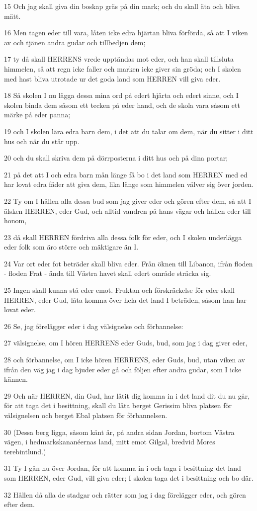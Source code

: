 \par 15 Och jag skall giva din boskap gräs på din mark; och du skall äta och bliva mätt.
\par 16 Men tagen eder till vara, låten icke edra hjärtan bliva förförda, så att I viken av och tjänen andra gudar och tillbedjen dem;
\par 17 ty då skall HERRENS vrede upptändas mot eder, och han skall tillsluta himmelen, så att regn icke faller och marken icke giver sin gröda; och I skolen med hast bliva utrotade ur det goda land som HERREN vill giva eder.
\par 18 Så skolen I nu lägga dessa mina ord på edert hjärta och edert sinne, och I skolen binda dem såsom ett tecken på eder hand, och de skola vara såsom ett märke på eder panna;
\par 19 och I skolen lära edra barn dem, i det att du talar om dem, när du sitter i ditt hus och när du står upp.
\par 20 och du skall skriva dem på dörrposterna i ditt hus och på dina portar;
\par 21 på det att I och edra barn mån länge få bo i det land som HERREN med ed har lovat edra fäder att giva dem, lika länge som himmelen välver sig över jorden.
\par 22 Ty om I hållen alla dessa bud som jag giver eder och gören efter dem, så att I älsken HERREN, eder Gud, och alltid vandren på hans vägar och hållen eder till honom,
\par 23 då skall HERREN fördriva alla dessa folk för eder, och I skolen underlägga eder folk som äro större och mäktigare än I.
\par 24 Var ort eder fot beträder skall bliva eder. Från öknen till Libanon, ifrån floden - floden Frat - ända till Västra havet skall edert område sträcka sig.
\par 25 Ingen skall kunna stå eder emot. Fruktan och förskräckelse för eder skall HERREN, eder Gud, låta komma över hela det land I beträden, såsom han har lovat eder.
\par 26 Se, jag förelägger eder i dag välsignelse och förbannelse:
\par 27 välsignelse, om I hören HERRENS eder Guds, bud, som jag i dag giver eder,
\par 28 och förbannelse, om I icke hören HERRENS, eder Guds, bud, utan viken av ifrån den väg jag i dag bjuder eder gå och följen efter andra gudar, som I icke kännen.
\par 29 Och när HERREN, din Gud, har låtit dig komma in i det land dit du nu går, för att taga det i besittning, skall du låta berget Gerissim bliva platsen för välsignelsen och berget Ebal platsen för förbannelsen.
\par 30 (Dessa berg ligga, såsom känt är, på andra sidan Jordan, bortom Västra vägen, i hedmarkskananéernas land, mitt emot Gilgal, bredvid Mores terebintlund.)
\par 31 Ty I gån nu över Jordan, för att komma in i och taga i besittning det land som HERREN, eder Gud, vill giva eder; I skolen taga det i besittning och bo där.
\par 32 Hållen då alla de stadgar och rätter som jag i dag förelägger eder, och gören efter dem.

